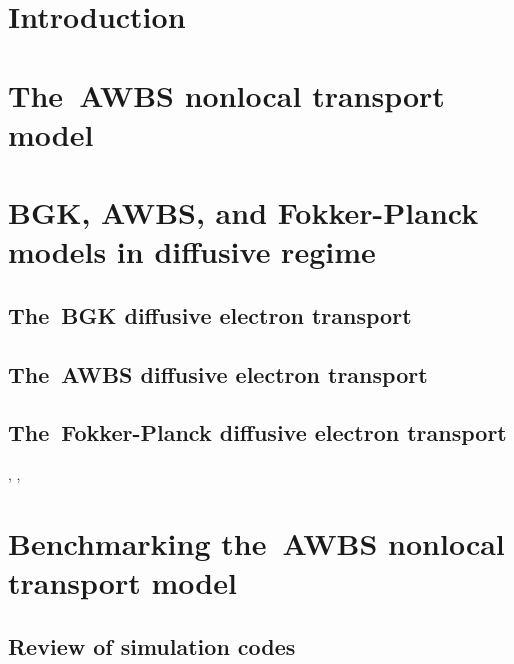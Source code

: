 \documentclass[preprint,12pt]{elsarticle}
\begin{document}
 \linenumbers
\pagebreak
\tableofcontents
\pagebreak

\section{Introduction}
\label{sec:Intro}

\section{The~AWBS nonlocal transport model}
\label{sec:AWBSmodel}
\cite{Fish_RMP1987}

\section{BGK, AWBS, and Fokker-Planck models in diffusive regime}
\label{sec:DiffusiveKinetics}

\subsection{The~BGK diffusive electron transport}
\label{sec:BGKDiffusiveRegime}

\subsection{The~AWBS diffusive electron transport}
\label{sec:AWBSDiffusiveRegime}

\subsection{The~Fokker-Planck diffusive electron transport}
\label{sec:FPDiffusiveRegime}

\cite{Rosenbluth_PR1957}, \cite{Longmire_1963}, \cite{Shkarofsky_1966}

\section{Benchmarking the~AWBS nonlocal transport model}
\label{sec:BenchmarkingAWBS}

\subsection{Review of simulation codes}
\label{sec:ReviewOfCodes}
\end{document}
